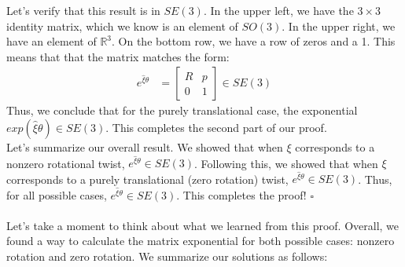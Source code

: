 \documentclass[oneside]{book}
\begin{document}
Let's verify that this result is in $SE(3)$. In the upper left, we have the $3\times 3$ identity matrix, which we know is an element of $SO(3)$. In the upper right, we have an element of $\mathbb{R}^3$. On the bottom row, we have a row of zeros and a 1. This means that that the matrix matches the form:
\begin{align}
    e^{\hat\xi\theta} 
    &= 
    \begin{bmatrix}
        R & p\\
        0 & 1
    \end{bmatrix} \in SE(3)
\end{align}
Thus, we conclude that for the purely translational case, the exponential $exp(\hat\xi\theta) \in SE(3)$. This completes the second part of our proof.\\
Let's summarize our overall result. We showed that when $\xi$ corresponds to a nonzero rotational twist, $e^{\hat\xi\theta} \in SE(3)$. Following this, we showed that when $\xi$ corresponds to a purely translational (zero rotation) twist, $e^{\hat\xi\theta} \in SE(3)$. Thus, for all possible cases, $e^{\hat\xi\theta} \in SE(3)$. This completes the proof! $\square$\\\\
Let's take a moment to think about what we learned from this proof. Overall, we found a way to calculate the matrix exponential for both possible cases: nonzero rotation and zero rotation. We summarize our solutions as follows:
\end{document}
